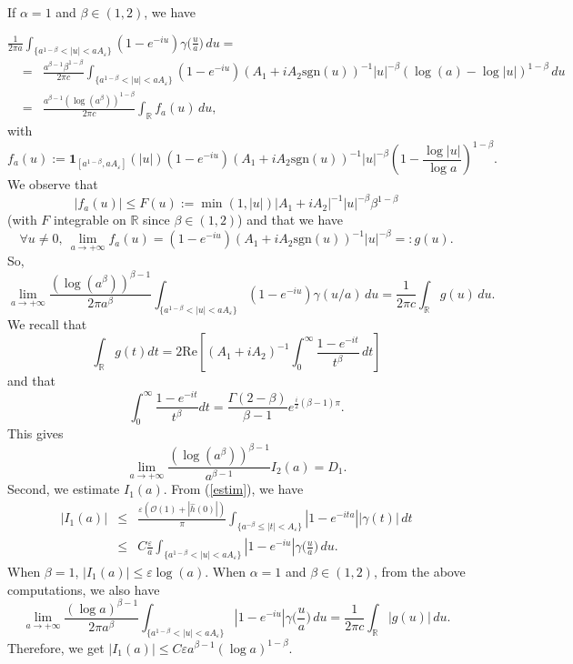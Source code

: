 \documentclass[oneside, a4paper,11pt,reqno]{amsart}
\begin{document}
\noindent If $\alpha=1$ and $\beta\in(1,2)$, we have

$\displaystyle\frac 1{2\pi a}\int_{\{a^{1-\beta}<|u|<a A_{\varepsilon}\}}
  (1-e^{- iu})\gamma\Big(\frac{u}{a}\Big)\, du=$
\begin{eqnarray*}
&=& \frac {a^{\beta-1}\beta^{1-\beta}}{2\pi c}\int_{\{a^{1-\beta}<|u|<a A_{\varepsilon}\}}
  (1-e^{-iu}) 
(A_1+iA_2 \text{sgn}(u))^{-1}|u|^{-\beta}(\log(a)-\log |u|)^{1-\beta}\, du\\
&=& \frac { a^{\beta-1}(\log (a^\beta))^{1-\beta}}
   {2\pi c}\int_{\mathbb R} f_a(u)\, du,
\end{eqnarray*}
with 
$$f_a(u):={\mathbf 1}_{[a^{1-\beta},a A_{\varepsilon}]}(|u|)
    (1-e^{-iu})
   (A_1+iA_2 \text{sgn}(u))^{-1}|u|^{-\beta}\left(1-\frac{\log |u|}{\log a}\right)^{1-\beta}.$$
We observe that
$$|f_a(u)|\le  F(u):=\min(1,|u|)|A_1+iA_2|^{-1}|u|^{-\beta}\beta^{1-\beta}$$
(with $F$ integrable on $\mathbb R$ since $\beta\in(1,2)$)
and that we have
$$\forall u\ne 0,\ \lim_{a\rightarrow +\infty} f_a(u) =     (1-e^{-iu})
   (A_1+iA_2 \text{sgn}(u))^{-1}|u|^{-\beta}=:g(u).$$
So,
$$\lim_{a\rightarrow +\infty}
  \frac { (\log (a^\beta))^{\beta-1} } {2\pi a^{\beta}}\int_{\{a^{1-\beta}<|u|<a A_{\varepsilon}\}}
  (1-e^{-iu})\gamma(u/a)\, du=\frac {1}
   {2\pi c}\int_{\mathbb R}g(u)\, du.$$
We recall that
$$\int_{\mathbb{R}} g(t) dt = 2 \textrm{Re}\left[(A_1+iA_2)^{-1}\int_0^\infty
 \frac{1-e^{-it}}{t^\beta}\, dt\right]$$
and that
$$\int_0^{\infty} \frac{1-e^{-it}}{t^{\beta}}dt= 
 \frac {\Gamma(2-\beta)}{\beta-1} e^{\frac i 2(\beta-1)\pi}.$$
This gives
$$\lim_{a\rightarrow +\infty} \frac { (\log (a^\beta))^{\beta-1} } { a^{\beta-1}} I_2(a)=D_1.$$
\textbullet Second,  we estimate $I_1(a)$. From (\ref{estim}), we have 
 \begin{eqnarray*}
|I_1(a) | &\leq  & \frac{\varepsilon(\mathcal O(1)+|\hat{h}(0)|)}{\pi} 
  \int_{\{a^{-\beta}\leq |t| < A_{\varepsilon} \}} |1-e^{-ita}|  |\gamma(t)|\, dt \\
  &\leq & C  \frac{\varepsilon}{ a}\int_{\{a^{1-\beta}<|u|<a A_{\varepsilon}\}}
  |1-e^{-iu}|  \gamma\Big(\frac{u}{a}\Big)\, du.
  \end{eqnarray*} 
When $\beta=1$, $|I_1(a)| \leq \varepsilon \log(a)$. When $\alpha=1$ and $\beta\in (1,2)$,  from the above computations, we also have 
$$\lim_{a\rightarrow +\infty}
  \frac { (\log a)^{\beta-1} } {2\pi a^{\beta}}\int_{\{a^{1-\beta}<|u|<a A_{\varepsilon}\}}
  |1-e^{-iu}|  \gamma\Big(\frac{u}{a}\Big)\, du=\frac {1}
   {2\pi c}\int_{\mathbb R} |g(u) |\, du.$$
 Therefore, we get $| I_1(a)| \leq C  \varepsilon   a^{\beta-1} (\log a)^{1-\beta}.$
 
\end{document}
